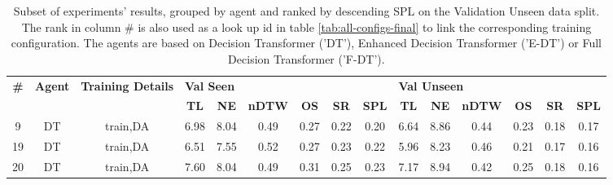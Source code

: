 \begin{table}
\centering
\caption{\label{tab:dagger_pe_oa}Subset of experiments' results, grouped by agent and ranked by descending SPL on the Validation Unseen data split. The rank in column \# is also used as a look up id in table \ref{tab:all-configs-final} to link the corresponding training configuration.     \newline The agents are based on Decision Transformer ('DT'), Enhanced Decision Transformer ('E-DT') or Full Decision Transformer ('F-DT').}
\begin{tabular}{@{\hskip3pt}c@{\hskip3pt}c@{\hskip3pt}c@{\hskip3pt}c@{\hskip3pt}c@{\hskip3pt}c@{\hskip3pt}c@{\hskip3pt}c@{\hskip3pt}c@{\hskip3pt}c@{\hskip3pt}c@{\hskip3pt}c@{\hskip3pt}c@{\hskip3pt}c@{\hskip3pt}c}
\toprule
\textbf{\#} & \textbf{Agent} & \textbf{Training Details} & \multicolumn{6}{l}{\textbf{Val Seen}} & \multicolumn{6}{l}{\textbf{Val Unseen}} \\
 \textbf{~} &     \textbf{~} &                \textbf{~} &       \textbf{TL} & \textbf{NE} & \textbf{nDTW} & \textbf{OS} & \textbf{SR} & \textbf{SPL} &         \textbf{TL} & \textbf{NE} & \textbf{nDTW} & \textbf{OS} & \textbf{SR} & \textbf{SPL} \\
\midrule
          9 &             DT &                  train,DA &              6.98 &        8.04 &          0.49 &        0.27 &        0.22 &         0.20 &                6.64 &        8.86 &          0.44 &        0.23 &        0.18 &         0.17 \\
         19 &             DT &                  train,DA &              6.51 &        7.55 &          0.52 &        0.27 &        0.23 &         0.22 &                5.96 &        8.23 &          0.46 &        0.21 &        0.17 &         0.16 \\
         20 &             DT &                  train,DA &              7.60 &        8.04 &          0.49 &        0.31 &        0.25 &         0.23 &                7.17 &        8.94 &          0.42 &        0.25 &        0.18 &         0.16 \\
\bottomrule
\end{tabular}
\end{table}
